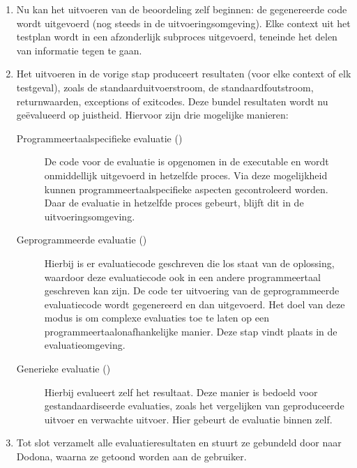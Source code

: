\begin{enumerate}
    Bij geïnterpreteerde programmeertalen wordt deze stap overgeslagen.
    \item Nu kan het uitvoeren van de beoordeling zelf beginnen: de gegenereerde code wordt uitgevoerd (nog steeds in de uitvoeringsomgeving).
    Elke context uit het testplan wordt in een afzonderlijk subproces uitgevoerd, teneinde het delen van informatie tegen te gaan.
    \item Het uitvoeren in de vorige stap produceert resultaten (voor elke context of elk testgeval), zoals de standaarduitvoerstroom, de standaardfoutstroom, returnwaarden, exceptions of exitcodes.
    Deze bundel resultaten wordt nu geëvalueerd op juistheid.
    Hiervoor zijn drie mogelijke manieren:
    \begin{description}
        \item[Programmeertaalspecifieke evaluatie ()]
        De code voor de evaluatie is opgenomen in de executable en wordt onmiddellijk uitgevoerd in hetzelfde proces.
        Via deze mogelijkheid kunnen programmeertaalspecifieke aspecten gecontroleerd worden.
        Daar de evaluatie in hetzelfde proces gebeurt, blijft dit in de uitvoeringsomgeving.
        \item[Geprogrammeerde evaluatie ()]
        Hierbij is er evaluatiecode geschreven die los staat van de oplossing, waardoor deze evaluatiecode ook in een andere programmeertaal geschreven kan zijn.
        De code ter uitvoering van de geprogrammeerde evaluatiecode wordt gegenereerd en dan uitgevoerd.
        Het doel van deze modus is om complexe evaluaties toe te laten op een programmeertaalonafhankelijke manier.
        Deze stap vindt plaats in de evaluatieomgeving.
        \item[Generieke evaluatie ()]
        Hierbij evalueert \tested{} zelf het resultaat.
        Deze manier is bedoeld voor gestandaardiseerde evaluaties, zoals het vergelijken van geproduceerde uitvoer en verwachte uitvoer.
        Hier gebeurt de evaluatie binnen \tested{} zelf.
    \end{description}
    \item Tot slot verzamelt \tested{} alle evaluatieresultaten en stuurt ze gebundeld door naar Dodona, waarna ze getoond worden aan de gebruiker.
\end{enumerate}


